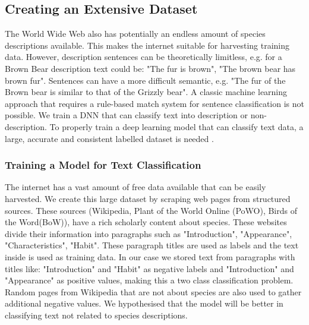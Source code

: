 \documentclass[a4paper, 12pt, oneside]{book} %
\begin{document}
\subsection{Creating an Extensive Dataset} \label{par:dataset}
The World Wide Web also has potentially an endless amount of species descriptions available.
This makes the internet suitable for harvesting training data.
However, description sentences can be theoretically limitless, e.g. for a Brown Bear description text could be: "The fur is brown", "The brown bear has brown fur".
Sentences can have a more difficult semantic, e.g. "The fur of the Brown bear is similar to that of the Grizzly bear".
A classic machine learning approach that requires a rule-based match system for sentence classification is not possible. 
We train a DNN that can classify text into description or non-description.
To properly train a deep learning model that can classify text data, a large, accurate and consistent labelled dataset is needed \autocite{munappy_data_2019}.

\subsubsection{Training a Model for Text Classification}
The internet has a vast amount of free data available that can be easily harvested.
We create this large dataset by scraping web pages from structured sources.
These sources (Wikipedia, Plant of the World Online (PoWO), Birds of the Word(BoW)), have a rich scholarly content about species.
These websites divide their information into paragraphs such as "Introduction", "Appearance", "Characteristics", "Habit".
These paragraph titles are used as labels and the text inside is used as training data.
In our case we stored text from paragraphs with titles like:  "Introduction" and "Habit" as negative labels and "Introduction" and "Appearance" as positive values, making this a two class classification problem. 
Random pages from Wikipedia that are not about species are also used to gather additional negative values.
We hypothesised that the model will be better in classifying text not related to species descriptions.
\end{document}
